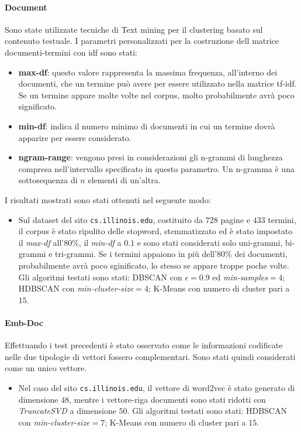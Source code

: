 \paragraph{Document}Sono state utilizzate tecniche di Text mining per il clustering basato sul contenuto testuale. I parametri personalizzati per la costruzione dell matrice documenti-termini con idf sono stati:
\begin{itemize}
\item \textbf{max-df}: questo valore rappresenta la massima frequenza, all'interno dei documenti, che un termine può avere per essere utilizzato nella matrice tf-idf. Se un termine appare molte volte nel corpus, molto probabilmente avrà poco significato.
\item \textbf{min-df}: indica il numero minimo di documenti in cui un termine dovrà apparire per essere considerato.
\item \textbf{ngram-range}: vengono presi in considerazioni gli n-grammi di lunghezza compresa nell'intervallo specificato in questo parametro. Un n-gramma è una sottosequenza  di $n$ elementi di un'altra.
\end{itemize}
I risultati mostrati sono stati ottenuti nel seguente modo:
\begin{itemize}
\item Sul dataset del sito \texttt{cs.illinois.edu}, costituito da $728$ pagine e $433$ termini, il corpus è stato ripulito delle stopword, stemmatizzato ed è stato impostato il \textit{max-df} all'80\%, il \textit{min-df} a $0.1$ e sono stati considerati solo uni-grammi, bi-grammi e tri-grammi. Se i termini appaiono in più dell'80\% dei documenti, probabilmente avrà poco sginificato, lo stesso se appare troppe poche volte. Gli algoritmi testati sono stati: DBSCAN con $\epsilon = 0.9$ ed \textit{min-samples}$ = 4$; HDBSCAN con \textit{min-cluster-size}$=4$; K-Means con numero di cluster pari a $15$. 
\end{itemize}

\paragraph{Emb-Doc}Effettuando i test precedenti è stato osservato come le informazioni codificate nelle due tipologie di vettori fossero complementari. Sono stati quindi considerati come un unico vettore.
\begin{itemize}
\item Nel caso del sito \texttt{cs.illinois.edu}, il vettore di word2vec è stato generato di dimensione $48$, mentre i vettore-riga documenti sono stati ridotti con \textit{TruncateSVD} a dimensione $50$. Gli algoritmi testati sono stati: HDBSCAN con \textit{min-cluster-size}$=7$; K-Means con numero di cluster pari a $15$. 
\end{itemize}

